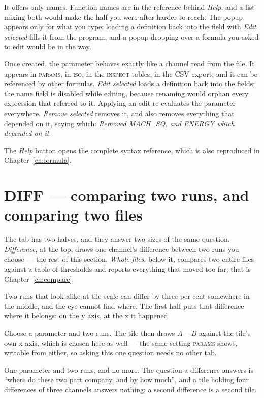 \documentclass[11pt,a4paper,oneside]{report}
\newcommand{\tab}[1]{\textsc{#1}}
\begin{document}
It offers only names. Function names are in the reference behind \emph{Help},
and a list mixing both would make the half you were after harder to reach. The
popup appears only for what you type: loading a definition back into the field
with \emph{Edit selected} fills it from the program, and a popup dropping over
a formula you asked to edit would be in the way.

Once created, the parameter behaves exactly like a channel read from the file.
It appears in \tab{params}, in \tab{iso}, in the \tab{inspect} tables, in the CSV
export, and it can be referenced by other formulas. \emph{Edit selected} loads a
definition back into the fields; the name field is disabled while editing,
because renaming would orphan every expression that referred to it. Applying an
edit re-evaluates the parameter everywhere. \emph{Remove selected} removes it,
and also removes everything that depended on it, saying which: \emph{Removed
MACH\_SQ, and ENERGY which depended on it}.

The \emph{Help} button opens the complete syntax reference, which is also
reproduced in Chapter~\ref{ch:formula}.

\section{DIFF --- comparing two runs, and comparing two files}
\label{sec:diff}

The tab has two halves, and they answer two sizes of the same question.
\emph{Difference}, at the top, draws one channel's difference between two runs
you choose --- the rest of this section. \emph{Whole files}, below it, compares
two entire files against a table of thresholds and reports everything that
moved too far; that is Chapter~\ref{ch:compare}.

Two runs that look alike at tile scale can differ by three per cent somewhere in
the middle, and the eye cannot find where. The first half puts that difference
where it belongs: on the y axis, at the x it happened.

Choose a parameter and two runs. The tile then draws $A - B$ against the tile's
own x axis, which is chosen here as well --- the same setting \tab{params}
shows, writable from either, so asking this one question needs no other tab.

One parameter and two runs, and no more. The question a difference answers is
``where do these two part company, and by how much'', and a tile holding four
differences of three channels answers nothing; a second difference is a second
tile.
\end{document}
